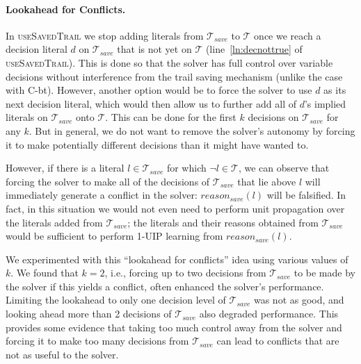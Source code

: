 \documentclass[runningheads]{llncs}
\newcommand{\trail}{\ensuremath{\mathcal{T}}}
\newcommand{\reasonsave}[1]{\ensuremath{\mathit{reason_{\mathit{save}}(#1)}}}
\newcommand{\cbt}{C-bt\xspace}
\newcommand{\trailsave}{\trail_{\mathit{save}}}
\newcommand{\ust}{\textsc{useSavedTrail}\xspace}
\begin{document}
\paragraph{Lookahead for Conflicts.}
In \ust we stop adding literals from $\trailsave$ to $\trail$ once we
reach a decision literal $d$ on $\trailsave$ that is not yet on
$\trail$ (line~\ref{ln:decnottrue} of \ust). This is done so that the
solver has full control over variable decisions without interference
from the trail saving mechanism (unlike the case with \cbt). However,
another option would be to force the solver to use $d$ as its next
decision literal, which would then allow us to further add all of
$d$'s implied literals on $\trailsave$ onto $\trail$. This can be done
for the first $k$ decisions on $\trailsave$ for any $k$. But in
general, we do not want to remove the solver's autonomy by forcing it
to make potentially different decisions than it might have wanted to.

However, if there is a literal $l\in\trailsave$ for which
$\lnot l\in \trail$, we can observe that forcing the solver to make
all of the decisions of $\trailsave$ that lie above $l$ will
immediately generate a conflict in the solver: $\reasonsave{l}$ will
be falsified. In fact, in this situation we would not even need to
perform unit propagation over the literals added from $\trailsave$;
the literals and their reasons obtained from $\trailsave$ would be
sufficient to perform 1-UIP learning from $\reasonsave{l}$.

We experimented with this ``lookahead for conflicts'' idea using
various values of $k$. We found that $k=2$, i.e., forcing up to two
decisions from $\trailsave$ to be made by the solver if this yields a
conflict, often enhanced the solver's performance. Limiting the lookahead to
only one decision level of $\trailsave$ was not as good, and looking
ahead more than 2 decisions of $\trailsave$ also degraded
performance. This provides some evidence that taking too much
control away from the solver and forcing it to make too many decisions
from $\trailsave$ can lead to conflicts that are not as useful to the
solver.
\end{document}
